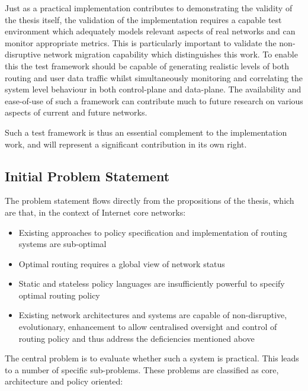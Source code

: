 \begin{itemize}
	      Just as a practical implementation contributes to demonstrating the validity of the thesis itself, the validation of the implementation requires a capable test environment which adequately models relevant aspects of real networks and can monitor appropriate metrics. This is particularly important to validate the non-disruptive network migration capability which distinguishes this work. To enable this the test framework should be capable of generating realistic levels of both routing and user data traffic whilst simultaneously monitoring and correlating the system level behaviour in both control-plane and data-plane. The availability and ease-of-use of such a framework can contribute much to future research on various aspects of current and future networks.

	      Such a test framework is thus an essential complement to the implementation work, and will represent a significant contribution in its own right.
\end{itemize}

\subsection{Initial Problem Statement}

The problem statement flows directly from the propositions of the thesis, which are that, in the context of Internet core networks:

\begin{itemize}
	\item Existing approaches to policy specification and implementation of routing systems are sub-optimal
	\item Optimal routing requires a global view of network status
	\item Static and stateless policy languages are insufficiently powerful to specify optimal routing policy
	\item Existing network architectures and systems are capable of non-disruptive, evolutionary, enhancement to allow centralised oversight and control of routing policy and thus address the deficiencies mentioned above
\end{itemize}

The central problem is to evaluate whether such a system is practical. This leads to a number of specific sub-problems. These problems are classified as core, architecture and policy oriented:

